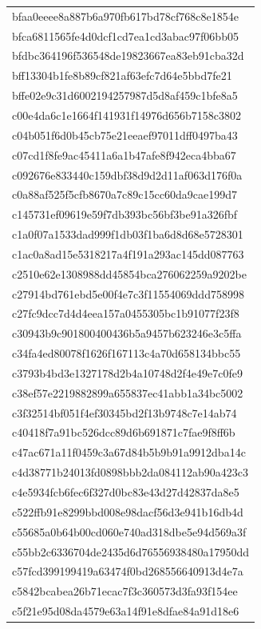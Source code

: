 \begin{tabular}{l}
bfaa0eeee8a887b6a970fb617bd78cf768c8e1854e \\
bfca6811565fe4d0dcf1cd7ea1cd3abac97f06bb05 \\
bfdbc364196f536548de19823667ea83eb91cba32d \\
bff13304b1fe8b89cf821af63efc7d64e5bbd7fe21 \\
bffe02e9c31d6002194257987d5d8af459c1bfe8a5 \\
c00e4da6c1e1664f141931f14976d656b7158c3802 \\
c04b051f6d0b45cb75e21eeaef97011dff0497ba43 \\
c07cd1f8fe9ac45411a6a1b47afe8f942eca4bba67 \\
c092676e833440c159dbf38d9d2d11af063d176f0a \\
c0a88af525f5cfb8670a7c89c15cc60da9cae199d7 \\
c145731ef09619e59f7db393bc56bf3be91a326fbf \\
c1a0f07a1533dad999f1db03f1ba6d8d68e5728301 \\
c1ac0a8ad15e5318217a4f191a293ac145dd087763 \\
c2510e62e1308988dd45854bca276062259a9202be \\
c27914bd761ebd5e00f4e7c3f11554069ddd758998 \\
c27fc9dcc7d4d4eea157a0455305bc1b91077f23f8 \\
c30943b9c901800400436b5a9457b623246e3c5ffa \\
c34fa4ed80078f1626f167113c4a70d658134bbc55 \\
c3793b4bd3e1327178d2b4a10748d2f4e49e7c0fe9 \\
c38ef57e2219882899a655837ec41abb1a34bc5002 \\
c3f32514bf051f4ef30345bd2f13b9748c7e14ab74 \\
c40418f7a91bc526dcc89d6b691871c7fae9f8ff6b \\
c47ac671a11f0459c3a67d84b5b9b91a9912dba14c \\
c4d38771b24013fd0898bbb2da084112ab90a423c3 \\
c4e5934fcb6fec6f327d0bc83e43d27d42837da8e5 \\
c522ffb91e8299bbd008e98dacf56d3e941b16db4d \\
c55685a0b64b00cd060e740ad318dbe5e94d569a3f \\
c55bb2c6336704de2435d6d76556938480a17950dd \\
c57fcd399199419a63474f0bd268556640913d4e7a \\
c5842bcabea26b71ecac7f3c360573d3fa93f154ee \\
c5f21e95d08da4579e63a14f91e8dfae84a91d18e6 \\

\end{tabular}
